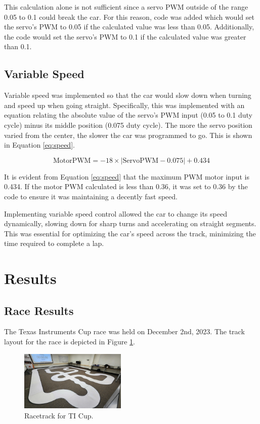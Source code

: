 \documentclass[conference]{IEEEtran}
\begin{document}
This calculation alone is not sufficient since a servo PWM outside of the range 0.05 to 0.1 could break the car. For this reason, code was added which would set the servo's PWM to 0.05 if the calculated value was less than 0.05. Additionally, the code would set the servo's PWM to 0.1 if the calculated value was greater than 0.1.

\subsection{Variable Speed}

Variable speed was implemented so that the car would slow down when turning and speed up when going straight. Specifically, this was implemented with an equation relating the absolute value of the servo's PWM input (0.05 to 0.1 duty cycle) minus its middle position (0.075 duty cycle). The more the servo position varied from the center, the slower the car was programmed to go. This is shown in Equation \ref{eq:speed}.

\begin{equation}
	\text{MotorPWM} = -18 \times |\text{ServoPWM} - 0.075| + 0.434 \label{eq:speed}
\end{equation}

It is evident from Equation \ref{eq:speed} that the maximum PWM motor input is 0.434. If the motor PWM calculated is less than 0.36, it was set to 0.36 by the code to ensure it was maintaining a decently fast speed.

Implementing variable speed control allowed the car to change its speed dynamically, slowing down for sharp turns and accelerating on straight segments. This was essential for optimizing the car's speed across the track, minimizing the time required to complete a lap.

\section{Results}

\subsection{Race Results}

The Texas Instruments Cup race was held on December 2nd, 2023. The track layout for the race is depicted in Figure \ref{fig:track}.

\begin{figure}[htbp]
	\centerline{\includegraphics[width=0.45\textwidth]{images/track.jpg}}
	\caption{Racetrack for TI Cup.}
	\label{fig:track}
\end{figure}
\end{document}
